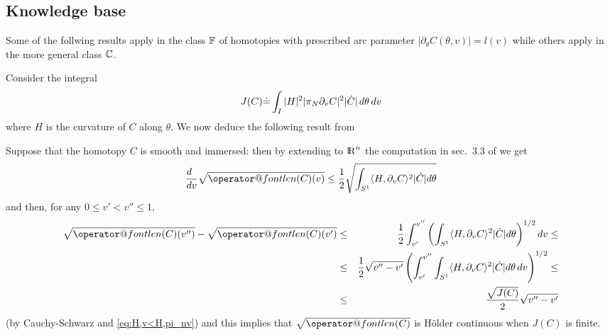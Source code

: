\documentclass[twoside,a4paper,english]{article}
\makeatletter
\def\derpar#1{\partial_{#1}}
\def\len{\mathop{\operator@font len}\nolimits}
\makeatother
\begin{document}
\subsection{Knowledge base}

Some of the follwing results apply
in the class ${\mathbb F}$ of homotopies with
prescribed arc parameter $|\derpar \theta C(\theta,v)|=l(v)$ while
others apply in the more general class $\mathbb C$.



\medskip

Consider the integral
\begin{equation}\label{eq:J(C)}
  J(C) \defeq \int_{I} |H|^2 |\pi_N \derpar v C|^2 |\dot C| \, d\theta\,dv 
\end{equation}
where $H$ is the curvature of $C$ along $\theta$.
We now deduce the following result from \cite{Michor-Mumford}
\begin{Proposition}\label{prop: l is C}
  Suppose that the homotopy $C$ is smooth and
  immersed: then by extending to ${\protect\mathrm{l\hskip-0.15em R}}^n$ 
  the computation in sec.~3.3 of \cite{Michor-Mumford} we get
  \[ \der v \sqrt{\len(C)(v)} \le \frac 1 2 
  \sqrt {\int_{S^1} \langle H, \derpar v C\rangle^2 |\dot C|d\theta} \]
  and then, for any $0\le v'<v'' \le1$,
  \begin{eqnarray*}
    \sqrt{\len(C)(v'')}- \sqrt{\len(C)(v')} &\le&  \frac 1 2 
    \int_{v'}^{v''} \left(\int_{S^1}  \langle H, \derpar v C\rangle^2
      |\dot C|d\theta    \right)^{1/2} dv 
    \le \\ &\le&
    \frac 1 2     \sqrt{v''-v'} 
      \left( \int_{v'}^{v''}\int_{S^1}  \langle H, \derpar v C\rangle^2
      |\dot C|d\theta\,dv    \right)^{1/2} 
    \le \\ &\le&
    \frac{ \sqrt{ J(C) }}2 \sqrt{v''-v'}
  \end{eqnarray*}
  (by Cauchy-Schwarz and \eqref{eq:H,v<H,pi_nv})
  and this implies that $\sqrt {\len(C)}$ is H\"older continuous
  when  $J(C)$  is finite.
\end{Proposition}
\end{document}
